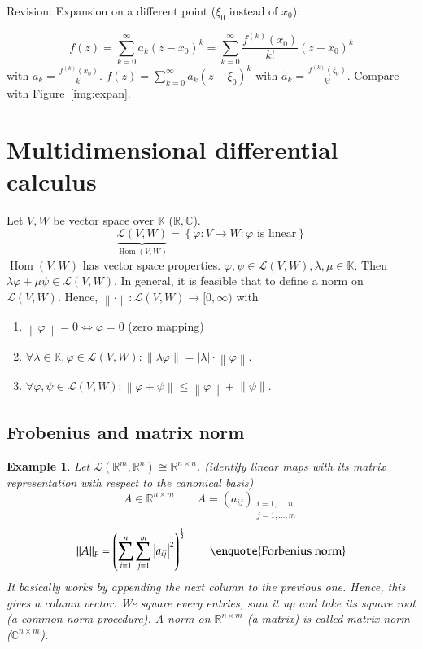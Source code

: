 \documentclass{article}
\newtheorem{example}{Example}  \numberwithin{example}{section}
\newcommand{\set}[1]{\left\{#1\right\}}
\newcommand{\norm}[1]{\left\|#1\right\|}
\newcommand{\card}[1]{\left|#1\right|}
\begin{document}
Revision: Expansion on a different point ($\xi_0$ instead of $x_0$):

\[ f(z) = \sum_{k=0}^\infty a_k (z - x_0)^k = \sum_{k=0}^\infty \frac{f^{(k)}(x_0)}{k!} (z - x_0)^k \]
with $a_k = \frac{f^{(k)}(x_0)}{k!}$. $f(z) = \sum_{k=0}^\infty \tilde a_k(z - \xi_0)^k$ with $\tilde a_k = \frac{f^{(k)}(\xi_0)}{k!}$.
Compare with Figure~\ref{img:expan}.

\section{Multidimensional differential calculus} %

Let $V,W$ be vector space over $\mathbb K$ ($\mathbb R, \mathbb C$).
\[ \underbrace{\mathcal L(V, W)}_{\operatorname{Hom}(V, W)} = \set{\varphi: V \to W: \varphi \text{ is linear}} \]
$\operatorname{Hom}(V, W)$ has vector space properties.
$\varphi, \psi \in \mathcal L(V, W), \lambda, \mu \in \mathbb K$.
Then $\lambda \varphi + \mu \psi \in \mathcal L(V, W)$.
In general, it is feasible that to define a norm on $\mathcal L(V, W)$.
Hence, $\norm{\cdot}: \mathcal L(V, W) \to [0, \infty)$ with
\begin{enumerate}
  \item $\norm{\varphi} = 0 \iff \varphi = 0$ (zero mapping)
  \item $\forall \lambda \in \mathbb K, \varphi \in \mathcal L(V, W): \norm{\lambda \varphi} = \card{\lambda} \cdot \norm{\varphi}$.
  \item $\forall \varphi, \psi \in \mathcal L(V, W): \norm{\varphi + \psi} \leq \norm{\varphi} + \norm{\psi}$.
\end{enumerate}

\subsection{Frobenius and matrix norm}

\begin{example}
  Let $\mathcal L(\mathbb R^m, \mathbb R^n) \cong \mathbb R^{n \times n}$.
  (identify linear maps with its matrix representation with respect to the canonical basis)
  \[ A \in \mathbb R^{n \times m} \qquad A = (a_{ij})_{\substack{i=1,\dots,n \\ j=1,\dots,m}} \]
  \[ \norm{A}_F = \left(\sum_{i=1}^n \sum_{j=1}^m \card{a_{ij}}^2\right)^{\frac12} \qquad \text{\enquote{Forbenius norm}} \]
  It basically works by appending the next column to the previous one. Hence, this gives a column vector. We square every entries, sum it up and take its square root (a common norm procedure).
  A norm on $\mathbb R^{n \times m}$ (a matrix) is called \emph{matrix norm} ($\mathbb C^{n \times m}$).
\end{example}
\end{document}

